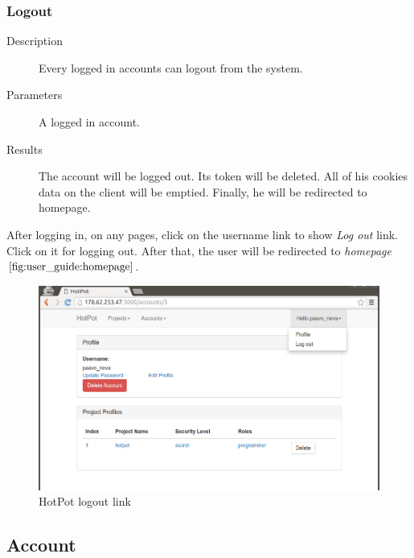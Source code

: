 \clearpage

\subsubsection{Logout}
\label{ch:result:user_guide:miscellaneous:logout}

\begin{description}
\item[Description] Every logged in accounts can logout from the system.
\item[Parameters] A logged in account.
\item[Results] The account will be logged out.
Its token will be deleted.
All of his cookies data on the client will be emptied.
Finally, he will be redirected to homepage.
\end{description}

After logging in, on any pages, click on the username link to show \emph{Log out} link.
Click on it for logging out.
After that, the user will be redirected to \emph{homepage} \(\autoref{fig:user_guide:homepage}\).

\begin{figure}[bth]                                                                                                                                                  \myfloatalign
\includegraphics[width=1.0\linewidth]{gfx/chapter_5/miscellaneous/logout}
\caption[HotPot logout link]{HotPot logout link}
\label{fig:user_guide:miscellaneous:logout}
\end{figure}


\subsection{Account}
\label{ch:result:user_guide:account}
